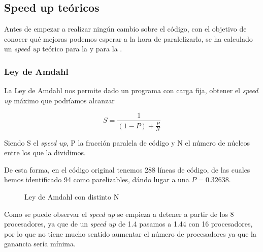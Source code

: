 \documentclass[12pt]{report} %
\begin{document}
\subsection{Speed up teóricos}

Antes de empezar a realizar ningún cambio sobre el código, con el objetivo de conocer qué mejoras
podemos esperar a la hora de paralelizarlo, se ha calculado un \textit{speed up} teórico para
la  y para la .

\subsubsection{Ley de Amdahl}
\label{sec:Amdahl}

La Ley de Amdahl nos permite dado un programa con carga fija, obtener el \textit{speed up} máximo que podríamos alcanzar

\[ S = \frac{1}{(1 - P) + \frac{P}{N}} \]

Siendo S el \textit{speed up}, P la fracción paralela de código y N el número de núcleos entre
los que la dividimos.

De esta forma, en el código original tenemos 288 líneas de código, de las cuales hemos identificado
94 como parelizables, dándo lugar a una $P = 0.32638$.

\begin{figure}[H]
    \caption{Ley de Amdahl con distinto N}
    \label{fig:ley_amdahl}
\end{figure}

Como se puede observar el \textit{speed up} se empieza a detener a partir de los 8 procesadores, ya que
de un \textit{speed up} de 1.4 pasamos a 1.44 con 16 procesadores, por lo que no tiene mucho sentido
aumentar el número de procesadores ya que la ganancia sería mínima.
\end{document}
